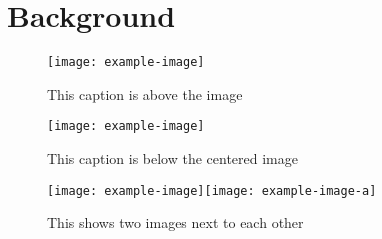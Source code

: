 \section{Background}\label{sec:background}

\begin{figure}[!htb]
  \caption{This caption is above the image}
  \texttt{[image: example-image]}
  \label{fig:test}
\end{figure}

\begin{figure}[!htb]
  \centering
  \texttt{[image: example-image]}
  \caption{This caption is below the centered image}
\end{figure}

\begin{figure}[!htb]
  \texttt{[image: example-image]}\quad\texttt{[image: example-image-a]}
  \caption{This shows two images next to each other}
\end{figure}